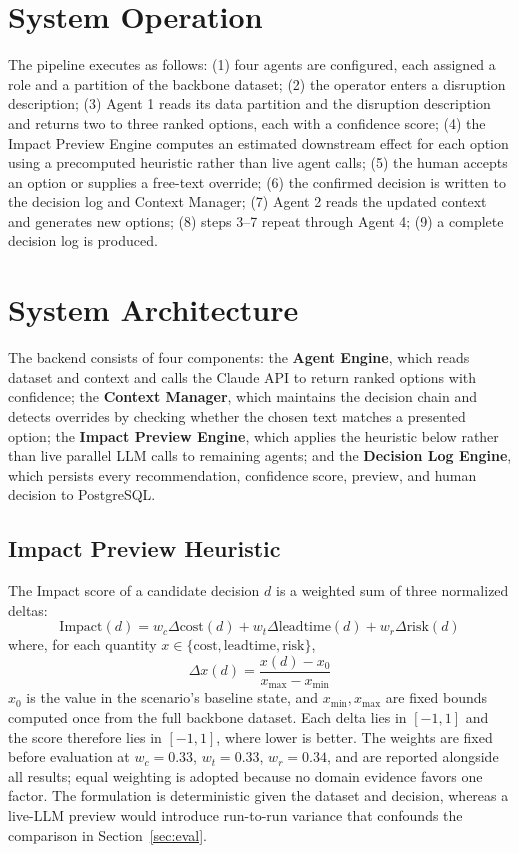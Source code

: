 \documentclass[conference]{IEEEtran}
\begin{document}
\section{System Operation}
The pipeline executes as follows: (1) four agents are configured, each assigned a role and a partition of the backbone dataset; (2) the operator enters a disruption description; (3) Agent 1 reads its data partition and the disruption description and returns two to three ranked options, each with a confidence score; (4) the Impact Preview Engine computes an estimated downstream effect for each option using a precomputed heuristic rather than live agent calls; (5) the human accepts an option or supplies a free-text override; (6) the confirmed decision is written to the decision log and Context Manager; (7) Agent 2 reads the updated context and generates new options; (8) steps 3--7 repeat through Agent 4; (9) a complete decision log is produced.

\section{System Architecture}
The backend consists of four components: the \textbf{Agent Engine}, which reads dataset and context and calls the Claude API to return ranked options with confidence; the \textbf{Context Manager}, which maintains the decision chain and detects overrides by checking whether the chosen text matches a presented option; the \textbf{Impact Preview Engine}, which applies the heuristic below rather than live parallel LLM calls to remaining agents; and the \textbf{Decision Log Engine}, which persists every recommendation, confidence score, preview, and human decision to PostgreSQL.

\subsection{Impact Preview Heuristic}
\label{sec:preview}
The Impact score of a candidate decision $d$ is a weighted sum of three normalized deltas:
\begin{equation}
\text{Impact}(d) = w_c \Delta\text{cost}(d) + w_t \Delta\text{leadtime}(d) + w_r \Delta\text{risk}(d)
\end{equation}
where, for each quantity $x \in \{\text{cost}, \text{leadtime}, \text{risk}\}$,
\begin{equation}
\Delta x(d) = \frac{x(d) - x_0}{x_{\max} - x_{\min}}
\end{equation}
$x_0$ is the value in the scenario's baseline state, and $x_{\min}, x_{\max}$ are fixed bounds computed once from the full backbone dataset. Each delta lies in $[-1,1]$ and the score therefore lies in $[-1,1]$, where lower is better. The weights are fixed before evaluation at $w_c = 0.33$, $w_t = 0.33$, $w_r = 0.34$, and are reported alongside all results; equal weighting is adopted because no domain evidence favors one factor. The formulation is deterministic given the dataset and decision, whereas a live-LLM preview would introduce run-to-run variance that confounds the comparison in Section~\ref{sec:eval}.
\end{document}
